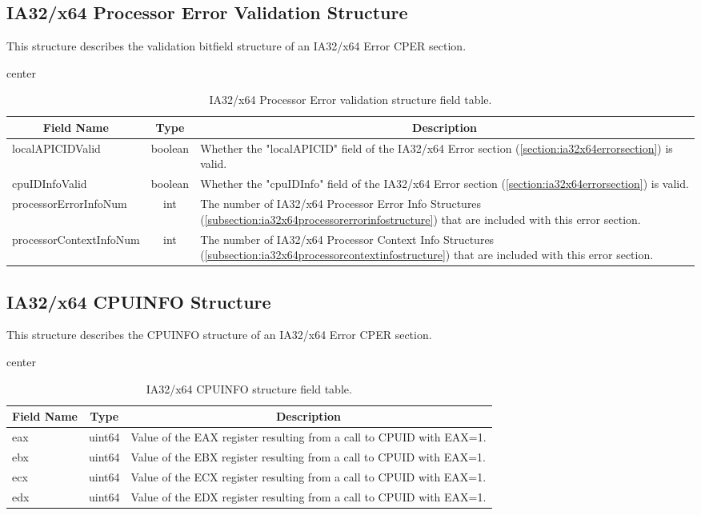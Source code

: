 \documentclass{report}
\newcommand*{\thead}[1]{\multicolumn{1}{|c|}{\bfseries #1}}
\newcommand*{\jsontable}[1]{
    \begin{table}[!ht]
    \label{#1}
    \centering
    \begin{adjustbox}{center}
    \begin{tabular}{|l|c|p{8cm}|}
    \hline
    \thead{Field Name} & \thead{Type} & \thead{Description} \\
    \hline
}
\newcommand*{\jsontableend}[1]{
    \hline
    \end{tabular}
    \end{adjustbox}
    \caption{#1}
    \label{table:#1}
    \end{table}
    \FloatBarrier
}
\begin{document}
\subsection{IA32/x64 Processor Error Validation Structure}
\label{subsection:ia32x64processorflagsstructure}
This structure describes the validation bitfield structure of an IA32/x64 Error CPER section.
\jsontable{table:ia32x64processorflagsstructure}
localAPICIDValid & boolean & Whether the "localAPICID" field of the IA32/x64 Error section (\ref{section:ia32x64errorsection}) is valid.\\
\hline
cpuIDInfoValid & boolean & Whether the "cpuIDInfo" field of the IA32/x64 Error section (\ref{section:ia32x64errorsection}) is valid.\\ 
\hline
processorErrorInfoNum & int & The number of IA32/x64 Processor Error Info Structures (\ref{subsection:ia32x64processorerrorinfostructure}) that are included with this error section.\\
\hline
processorContextInfoNum & int & The number of IA32/x64 Processor Context Info Structures (\ref{subsection:ia32x64processorcontextinfostructure}) that are included with this error section.\\
\jsontableend{IA32/x64 Processor Error validation structure field table.}

\subsection{IA32/x64 CPUINFO Structure}
\label{subsection:ia32x64cpuinfostructure}
This structure describes the CPUINFO structure of an IA32/x64 Error CPER section.
\jsontable{table:ia32x64cpuinfostructure}
eax & uint64 & Value of the EAX register resulting from a call to CPUID with EAX=1.\\
\hline
ebx & uint64 & Value of the EBX register resulting from a call to CPUID with EAX=1.\\
\hline
ecx & uint64 & Value of the ECX register resulting from a call to CPUID with EAX=1.\\
\hline
edx & uint64 & Value of the EDX register resulting from a call to CPUID with EAX=1.\\
\jsontableend{IA32/x64 CPUINFO structure field table.}

\end{document}
